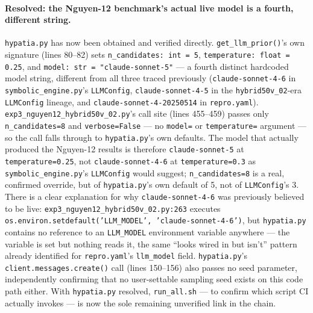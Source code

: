 \documentclass[11pt]{article}
\begin{document}
\paragraph{Resolved: the Nguyen-12 benchmark's actual live model is a
fourth, different string.} \texttt{hypatia.py} has now been obtained and
verified directly. \texttt{get\_llm\_prior()}'s own signature (lines
80--82) sets \texttt{n\_candidates: int = 5}, \texttt{temperature: float =
0.25}, and \texttt{model: str = "claude-sonnet-5"} --- a fourth distinct
hardcoded model string, different from all three traced previously
(\texttt{claude-sonnet-4-6} in \texttt{symbolic\_engine.py}'s
\texttt{LLMConfig}, \texttt{claude-sonnet-4-5} in the
\texttt{hybrid50v\_02}-era \texttt{LLMConfig} lineage, and
\texttt{claude-sonnet-4-20250514} in \texttt{repro.yaml}).
\texttt{exp3\_nguyen12\_hybrid50v\_02.py}'s call site (lines 455--459)
passes only \texttt{n\_candidates=8} and \texttt{verbose=False} --- no
\texttt{model=} or \texttt{temperature=} argument --- so the call falls
through to \texttt{hypatia.py}'s own defaults. The model that actually
produced the Nguyen-12 results is therefore \texttt{claude-sonnet-5} at
\texttt{temperature=0.25}, not \texttt{claude-sonnet-4-6} at
\texttt{temperature=0.3} as \texttt{symbolic\_engine.py}'s
\texttt{LLMConfig} would suggest; \texttt{n\_candidates=8} is a real,
confirmed override, but of \texttt{hypatia.py}'s own default of 5, not of
\texttt{LLMConfig}'s 3. There is a clear explanation for why
\texttt{claude-sonnet-4-6} was previously believed to be live:
\texttt{exp3\_nguyen12\_hybrid50v\_02.py:263} executes
\texttt{os.environ.setdefault('LLM\_MODEL', 'claude-sonnet-4-6')}, but
\texttt{hypatia.py} contains no reference to an \texttt{LLM\_MODEL}
environment variable anywhere --- the variable is set but nothing reads
it, the same ``looks wired in but isn't'' pattern already identified for
\texttt{repro.yaml}'s \texttt{llm\_model} field. \texttt{hypatia.py}'s
\texttt{client.messages.create()} call (lines 150--156) also passes no
seed parameter, independently confirming that no user-settable sampling
seed exists on this code path either. With \texttt{hypatia.py} resolved,
\texttt{run\_all.sh} --- to confirm which script CI actually invokes ---
is now the sole remaining unverified link in the chain.
\end{document}
